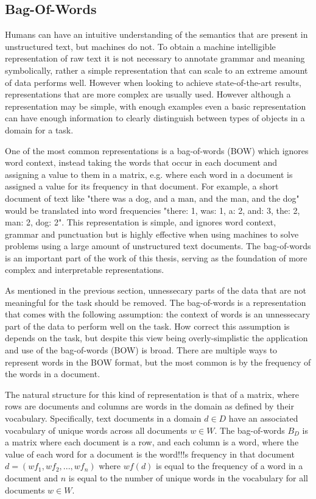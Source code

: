 \subsection{Bag-Of-Words}\label{bg:BOW}

Humans can have an intuitive understanding of the semantics that are present in unstructured text, but machines do not.  To obtain a machine intelligible representation of raw text it is not necessary to  annotate grammar and meaning symbolically, rather a simple representation that can scale to an extreme amount of data performs well. However when looking to achieve state-of-the-art results, representations that are more complex are usually used. However although a representation may be simple, with enough examples even a basic representation can have enough information to clearly distinguish between types of objects in a domain for a task. 

One of the most common representations is a bag-of-words (BOW) which ignores word context, instead taking the words that occur in each document and assigning a value to them in a matrix, e.g. where each word in a document is assigned a value for  its frequency in that document. For example, a short document of text like "there was a dog, and a man, and the man, and the dog" would be translated into word frequencies "there: 1, was: 1, a: 2, and: 3, the: 2, man: 2, dog: 2". This representation is simple, and ignores word context, grammar and punctuation but is highly effective when using machines to solve problems using a large amount of unstructured text documents. The bag-of-words is an important part of the work of this thesis, serving as the foundation of more complex and interpretable representations. 

As mentioned in the previous section, unnessecary parts of the data that are not  meaningful for the task should be removed. The bag-of-words is a representation that comes with the following assumption: the context of words is an unnessecary part of the data to perform well on the task. How correct this assumption is depends on the task, but despite this view being overly-simplistic the application and use of the bag-of-words (BOW) is broad. There are multiple ways to represent words in the BOW format, but the most common is by the frequency of the words in a document.

The natural structure for this kind of representation is that of a matrix, where rows are documents and columns are words in the domain as defined by their vocabulary. Specifically,  text documents in a domain $d \in D$ have an associated vocabulary of unique words across all documents $w \in W$. The bag-of-words $B_D$ is a matrix where each document is a row, and each column is a word, where the value of each word for a document is the word!!!s frequency in that document $d = ({wf}_1, {wf}_2, ..., {wf}_n)$ where ${wf}(d)$ is equal to the frequency of a word in a document and $n$ is equal to the number of unique words  in the vocabulary for all documents $w \in W$.

